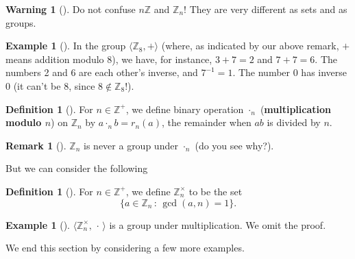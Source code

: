 \documentclass[10pt,]{book}
\newcommand{\terminology}[1]{\textbf{#1}}
\theoremstyle{plain}
\theoremstyle{definition}
\newtheorem{definition}[theorem]{Definition}
\theoremstyle{definition}
\newtheorem{remark}[theorem]{Remark}
\newtheorem{warning}[theorem]{Warning}
\theoremstyle{definition}
\newtheorem{example}[theorem]{Example}
\theoremstyle{definition}
\numberwithin{equation}{section}
\def\Z{\mathbb{Z}}
\begin{document}
\begin{warning}[]\label{warning-11}
Do not confuse \(n\Z\) and \(\Z_n\)! They are very different as sets and as groups.%
\end{warning}
\begin{example}[]\label{example-17}
In the group \(\langle \Z_8,+\rangle\) (where, as indicated by our above remark, \(+\) means addition modulo \(8\)), we have, for instance, \(3+7=2\) and \(7+7=6\). The numbers 2 and 6 are each other's inverse, and \(7^{-1}=1\). The number \(0\) has inverse \(0\) (it can't be \(8\), since \(8\not\in \Z_8\)!).%
\end{example}
\begin{definition}[{}]\label{definition-28}
For \(n\in \Z^+\), we define binary operation \(\cdot_n\) (\terminology{multiplication modulo \(n\)}) on \(\Z_n\) by \(a\cdot_n b = r_n(a)\), the remainder when \(ab\) is divided by \(n\).%
\end{definition}
\begin{remark}[]\label{remark-15}
\(\Z_n\) is never a group under \(\cdot_n\) (do you see why?).%
\end{remark}
But we can consider the following%
\begin{definition}[{}]\label{definition-29}
For \(n\in \Z^+\), we define \(\Z_n^{\times}\) to be the set%
\begin{equation*}
\{a\in \Z_n\,:\,\gcd(a,n)=1\}\text{.}
\end{equation*}
%
\end{definition}
\begin{example}[]\label{example-18}
\(\langle \Z_n^{\times},\,\cdot\, \rangle\) is a group under multiplication. We omit the proof.%
\end{example}
We end this section by considering a few more examples.%
\end{document}
